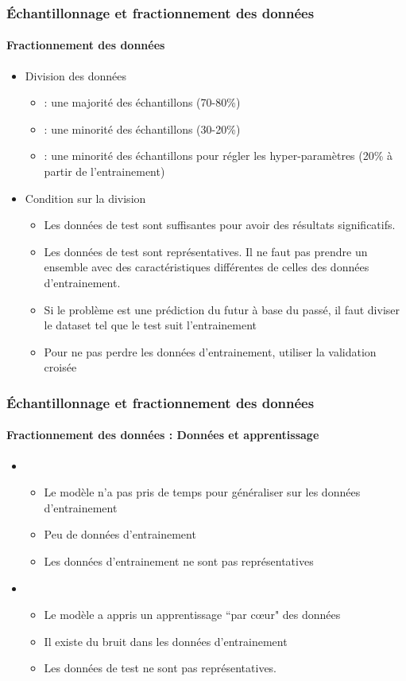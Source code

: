 \documentclass[xcolor=table]{beamer}
\begin{document}
\begin{frame}
	\frametitle{Échantillonnage et fractionnement des données}
	\framesubtitle{Fractionnement des données}
	
	\begin{itemize}
		\item Division des données
		\begin{itemize}
			\item {} : une majorité des échantillons (70-80\%)
			\item {} : une minorité des échantillons (30-20\%)
			\item {} : une minorité des échantillons pour régler les hyper-paramètres (20\% à partir de l'entrainement)
		\end{itemize}
		\item Condition sur la division
		\begin{itemize}
			\item Les données de test sont suffisantes pour avoir des résultats significatifs.
			\item Les données de test sont représentatives. Il ne faut pas prendre un ensemble avec des caractéristiques différentes de celles des données d'entrainement.
			\item Si le problème est une prédiction du futur à base du passé, il faut diviser le dataset tel que le test suit l'entrainement
			\item Pour ne pas perdre les données d'entrainement, utiliser la validation croisée
		\end{itemize}
	\end{itemize}
	
\end{frame}

\begin{frame}
	\frametitle{Échantillonnage et fractionnement des données}
	\framesubtitle{Fractionnement des données : Données et apprentissage}
	
	\begin{itemize}
		\item {}
		\begin{itemize}
			\item Le modèle n'a pas pris de temps pour généraliser sur les données d'entrainement
			\item Peu de données d'entrainement
			\item Les données d'entrainement ne sont pas représentatives 
		\end{itemize}
		\item {}
		\begin{itemize}
			\item Le modèle a appris un apprentissage ``par cœur" des données
			\item Il existe du bruit dans les données d'entrainement
			\item Les données de test ne sont pas représentatives. 
		\end{itemize}
	\end{itemize}
	
\end{frame}
\end{document}
